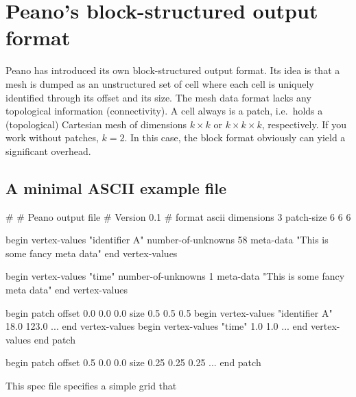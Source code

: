 \section{Peano's block-structured output format}


Peano has introduced its own block-structured output format.
Its idea is that a mesh is dumped as an unstructured set of cell where each cell
is uniquely identified through its offset and its size. 
The mesh data format lacks any topological information (connectivity).
A cell always is a patch, i.e.~holds a (topological) Cartesian mesh of
dimensions $k \times k$ or $k \times k \times k $, respectively.
If you work without patches, $k=2$. 
In this case, the block format obviously can yield a significant overhead.



\subsection{A minimal ASCII example file}
\begin{code}
#
# Peano output file
# Version 0.1
#
format ascii
dimensions 3
patch-size 6 6 6

begin vertex-values "identifier A"
  number-of-unknowns 58
  meta-data "This is some fancy meta data"  
end vertex-values

begin vertex-values "time"
  number-of-unknowns 1
  meta-data "This is some fancy meta data"  
end vertex-values

begin patch
  offset 0.0 0.0 0.0
  size   0.5 0.5 0.5
  begin vertex-values "identifier A"
    18.0 123.0 ...
  end vertex-values
  begin vertex-values "time"
    1.0 1.0 ...
  end vertex-values
end patch 

begin patch
  offset 0.5 0.0 0.0
  size   0.25 0.25 0.25
  ...
end patch 
\end{code}

\noindent
This spec file specifies a simple grid that


